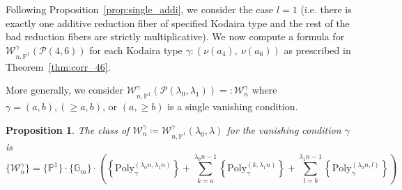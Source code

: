 \documentclass[a4paper,12pt]{amsart}
\newtheorem{prop}[thm]{Proposition}
\theoremstyle{definition}
\newcommand{\bP}{\mathbb{P}}
\newcommand{\cW}{\mathcal{W}}
\newcommand{\cP}{\mathcal{P}}
\newcommand{\Pc}{\mathcal{P}}
\newcommand{\Pb}{\mathbb{P}}
\newcommand{\Gb}{\mathbb{G}}
\begin{document}
	Following Proposition~\ref{prop:single_addi}, we consider the case $l = 1$ (i.e. there is exactly one additive reduction fiber of specified Kodaira type and the rest of the bad reduction fibers are strictly multiplicative). We now compute a formula for $\cW^\gamma_{n,\Pb^1}(\Pc(4,6))$ for each Kodaira type $\gamma : (\nu(a_4), ~ \nu(a_6))$ as prescribed in Theorem~\ref{thm:corr_46}. 
	
	
	
	\smallskip
	
	More generally, we consider $\cW^\gamma_{n,\bP^1}(\cP(\lambda_0,\lambda_1)) =\colon \cW^{\gamma}_n$ where $\gamma = (a,b), (\geq a, b)$, or $(a, \geq b)$ is a single vanishing condition. 
	
	\begin{prop} \label{prop:W0}
		The class of $\cW^\gamma_n \coloneqq \cW^\gamma_{n,\Pb^1}(\lambda_0,\lambda)$ for the vanishing condition $\gamma$ is
		\begin{equation*}\label{eqn:W_gen}
			\{\cW^\gamma_n\} = \{\Pb^1\} \cdot \{\Gb_m\} \cdot \left(\left\{\mathrm{Poly}_{\gamma}^{(\lambda_0n,\lambda_1n)}\right\}+\sum_{k=a}^{\lambda_0n-1}\left\{\mathrm{Poly}_{\gamma}^{(k,\lambda_1n)}\right\}+\sum_{l=b}^{\lambda_1n-1}\left\{\mathrm{Poly}_{\gamma}^{(\lambda_0n,l)}\right\}\right)
		\end{equation*}
	\end{prop}
	
\end{document}
